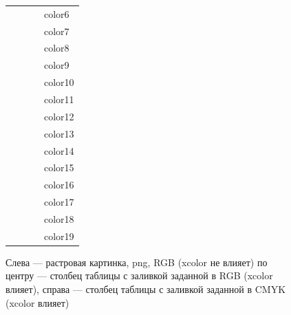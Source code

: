 \begin{figure}[!htb]
\begin{minipage}{0.5\textwidth}
\begin{tabular}{p{1.5cm} p{1cm} p{1.5cm} p{1cm}}
          \cellcolor[rgb]{0.00000,1.00000,1.00000}{~} & ~ & \cellcolor[cmyk]{0.84741,0.00000,0.02052,0.00026}{~} & {color6} \\
          \cellcolor[rgb]{0.00000,0.75294,0.00000}{~} & ~ & \cellcolor[cmyk]{0.78500,0.00000,0.99997,0.00032}{~} & {color7} \\
          \cellcolor[rgb]{0.00000,0.25098,0.00000}{~} & ~ & \cellcolor[cmyk]{0.74954,0.41801,0.83082,0.63682}{~} & {color8} \\
          \cellcolor[rgb]{0.50196,0.00000,0.00000}{~} & ~ & \cellcolor[cmyk]{0.26699,0.98015,0.81404,0.43252}{~} & {color9} \\
          \cellcolor[rgb]{0.75294,0.25098,0.00000}{~} & ~ & \cellcolor[cmyk]{0.08933,0.89926,0.96097,0.06418}{~} & {color10} \\
          \cellcolor[rgb]{0.00000,1.00000,0.00000}{~} & ~ & \cellcolor[cmyk]{0.64434,0.00000,0.99997,0.00000}{~} & {color11} \\
          \cellcolor[rgb]{1.00000,0.00000,0.00000}{~} & ~ & \cellcolor[cmyk]{0.00012,0.99997,0.99840,0.01167}{~} & {color12} \\
          \cellcolor[rgb]{1.00000,0.00000,0.60000}{~} & ~ & \cellcolor[cmyk]{0.00627,0.99583,0.05092,0.00235}{~} & {color13} \\
          \cellcolor[rgb]{1.00000,0.50196,0.00000}{~} & ~ & \cellcolor[cmyk]{0.00317,0.75140,0.98398,0.00516}{~} & {color14} \\
          \cellcolor[rgb]{0.50196,0.50196,1.00000}{~} & ~ & \cellcolor[cmyk]{0.80249,0.35647,0.00000,0.00034}{~} & {color15} \\
          \cellcolor[rgb]{0.47451,0.20000,0.82353}{~} & ~ & \cellcolor[cmyk]{0.77577,0.84265,0.00000,0.00157}{~} & {color16} \\
          \cellcolor[rgb]{1.00000,1.00000,0.00000}{~} & ~ & \cellcolor[cmyk]{0.05483,0.00124,0.97897,0.00024}{~} & {color17} \\
          \cellcolor[rgb]{1.00000,0.50196,0.50196}{~} & ~ & \cellcolor[cmyk]{0.00673,0.76382,0.56541,0.00029}{~} & {color18} \\
          \cellcolor[rgb]{0.20000,0.40000,0.00000}{~} & ~ & \cellcolor[cmyk]{0.74580,0.29775,0.94908,0.26606}{~} & {color19} \\
		\end{tabular}%
	\end{minipage}%
	\caption{Слева --- растровая картинка, png, RGB (xcolor не влияет) \newline
			 по центру --- столбец таблицы с заливкой заданной в RGB (xcolor влияет), 
			 справа --- столбец таблицы с заливкой заданной в CMYK (xcolor влияет)}
\end{figure}%
